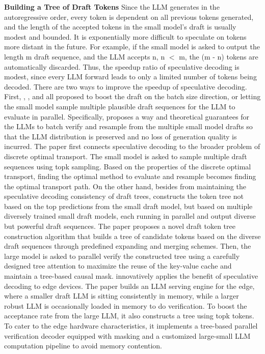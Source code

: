 \textbf{Building a Tree of Draft Tokens} Since the LLM generates in the autoregressive order, every token is dependent on all previous tokens generated, and the length of the accepted tokens in the small model's draft is usually modest and bounded. It is exponentially more difficult to speculate on tokens more distant in the future. For example, if the small model is asked to output the length m draft sequence, and the LLM accepts n, n $<$ m, the (m - n) tokens are automatically discarded. 
Thus, the speedup ratio of speculative decoding is modest, since every LLM forward leads to only a limited number of tokens being decoded. 
There are two ways to improve the speedup of speculative decoding. First, \cite{sun2023spectr}, \cite{miao2023specinfer}, and \cite{xu2023llmcad} all proposed to boost the draft on the batch size direction, or letting the small model sample multiple plausible draft sequences for the LLM to evaluate in parallel. Specifically, \cite{sun2023spectr} proposes a way and theoretical guarantees for the LLMs to batch verify and resample from the multiple small model drafts so that the LLM distribution is preserved and no loss of generation quality is incurred. The paper first connects speculative decoding to the broader problem of discrete optimal transport. The small model is asked to sample multiple draft sequences using topk sampling. Based on the properties of the discrete optimal transport, finding the optimal method to evaluate and resample becomes finding the optimal transport path. On the other hand, besides from maintaining the speculative decoding consistency of draft trees, \cite{miao2023specinfer} constructs the token tree not based on the top predictions from the small draft model, but based on multiple diversely trained small draft models, each running in parallel and output diverse but powerful draft sequences. The paper proposes a novel draft token tree construction algorithm that builds a tree of candidate tokens based on the diverse draft sequences through predefined expanding and merging schemes. Then, the large model is asked to parallel verify the constructed tree using a carefully designed tree attention to maximize the reuse of the key-value cache and maintain a tree-based causal mask. \cite{xu2023llmcad} innovatively applies the benefit of speculative decoding to edge devices. The paper builds an LLM serving engine for the edge, where a smaller draft LLM is sitting consistently in memory, while a larger robust LLM is occasionally loaded in memory to do verification. To boost the acceptance rate from the large LLM, it also constructs a tree using topk tokens. To cater to the edge hardware characteristics, it implements a tree-based parallel verification decoder equipped with masking and a customized large-small LLM computation pipeline to avoid memory contention. 

